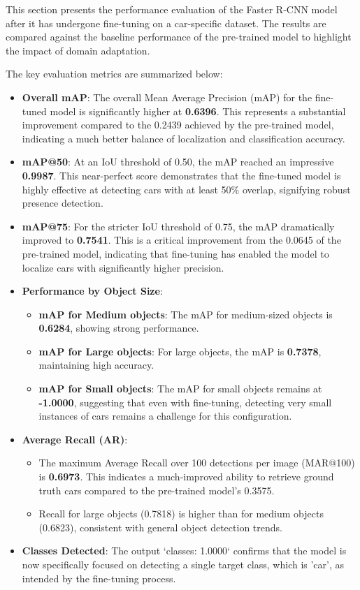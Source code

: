 \documentclass[conference]{IEEEtran}
\begin{document}
This section presents the performance evaluation of the Faster R-CNN model after it has undergone fine-tuning on a car-specific dataset. The results are compared against the baseline performance of the pre-trained model to highlight the impact of domain adaptation.

The key evaluation metrics are summarized below:

\begin{itemize}
    \item \textbf{Overall mAP}: The overall Mean Average Precision (mAP) for the fine-tuned model is significantly higher at \textbf{0.6396}. This represents a substantial improvement compared to the 0.2439 achieved by the pre-trained model, indicating a much better balance of localization and classification accuracy.
    \item \textbf{mAP@50}: At an IoU threshold of 0.50, the mAP reached an impressive \textbf{0.9987}. This near-perfect score demonstrates that the fine-tuned model is highly effective at detecting cars with at least 50\% overlap, signifying robust presence detection.
    \item \textbf{mAP@75}: For the stricter IoU threshold of 0.75, the mAP dramatically improved to \textbf{0.7541}. This is a critical improvement from the 0.0645 of the pre-trained model, indicating that fine-tuning has enabled the model to localize cars with significantly higher precision.
    \item \textbf{Performance by Object Size}:
    \begin{itemize}
        \item \textbf{mAP for Medium objects}: The mAP for medium-sized objects is \textbf{0.6284}, showing strong performance.
        \item \textbf{mAP for Large objects}: For large objects, the mAP is \textbf{0.7378}, maintaining high accuracy.
        \item \textbf{mAP for Small objects}: The mAP for small objects remains at \textbf{-1.0000}, suggesting that even with fine-tuning, detecting very small instances of cars remains a challenge for this configuration.
    \end{itemize}
    \item \textbf{Average Recall (AR)}:
    \begin{itemize}
        \item The maximum Average Recall over 100 detections per image (MAR@100) is \textbf{0.6973}. This indicates a much-improved ability to retrieve ground truth cars compared to the pre-trained model's 0.3575.
        \item Recall for large objects (0.7818) is higher than for medium objects (0.6823), consistent with general object detection trends.
    \end{itemize}
    \item \textbf{Classes Detected}: The output `classes: 1.0000` confirms that the model is now specifically focused on detecting a single target class, which is 'car', as intended by the fine-tuning process.
\end{itemize}
\end{document}
